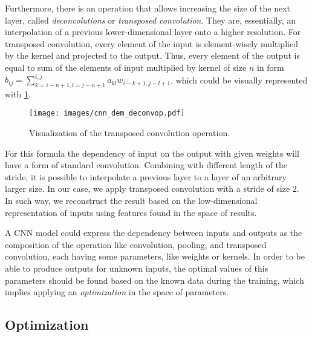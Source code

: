 
Furthermore, there is an operation that allows increasing the size of the next layer, called \emph{deconvolutions} or \textit{transposed convolution}.
They are, essentially, an interpolation of a previous lower-dimensional layer onto a higher resolution.
For transposed convolution, every element of the input is element-wisely multiplied by the kernel and projected to the output. Thus, every element of the output is equal to sum of the elements of input multiplied by kernel of size $n$ in form $b_{ij} = \sum_{k=i-n+1,l=j-n+1}^{i,j} a_{kl}w_{i-k+1,j-l+1}$, which could be visually represented with \ref{fig:deconv_op}.
\begin{figure}[h]
	\centering
	\texttt{[image: images/cnn\_dem\_deconvop.pdf]}
	\label{fig:deconv_op}
	\caption{Visualization of the transposed convolution operation.}
\end{figure}
For this formula the dependency of input on the output with given weights will have a form of standard convolution.\cite{}
Combining with different length of the stride, it is possible to interpolate a previous layer to a layer of an arbitrary larger size. 
In our case, we apply transposed convolution with a stride of size $2$.
In such way, we reconstruct the result based on the low-dimensional representation of inputs using features found in the space of results.
\medskip

A CNN model could express the dependency between inputs and outputs as the composition of the operation like convolution, pooling, and transposed convolution, each having some parameters, like weights or kernels.
In order to be able to produce outputs for unknown inputs, the optimal values of this parameters should be found based on the known data during the training, which implies applying an \emph{optimization} in the space of parameters. 

\subsection{Optimization}

